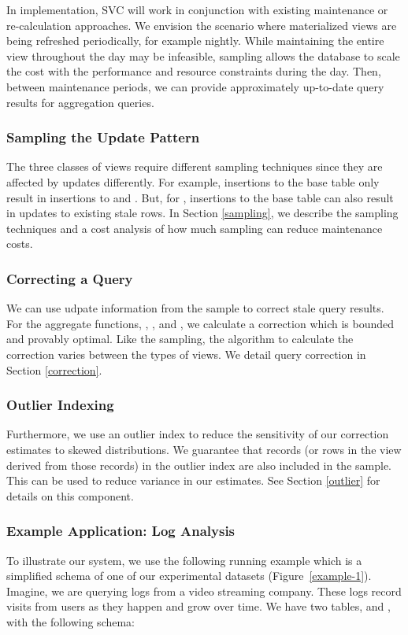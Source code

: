 In implementation, SVC will work in conjunction with existing maintenance or re-calculation approaches.
We envision the scenario where materialized views are being refreshed periodically, for example nightly.
While maintaining the entire view throughout the day may be infeasible, sampling allows the database to scale the cost with the performance and resource constraints during the day.
Then, between maintenance periods, we can provide approximately up-to-date query results for aggregation queries.

\subsubsection{Sampling the Update Pattern}
The three classes of views require different sampling techniques since they are affected by updates differently.
For example, insertions to the base table only result in insertions to \spview and \fjview.
But, for \aggview, insertions to the base table can also result in updates to existing stale rows.
In Section \ref{sampling}, we describe the sampling techniques and a cost analysis of how much sampling can reduce maintenance costs.

\subsubsection{Correcting a Query}
We can use udpate information from the sample to correct stale query results.
For the aggregate functions, \sumfunc, \countfunc, and \avgfunc, we calculate a correction
which is bounded and provably optimal.
Like the sampling, the algorithm to calculate the correction varies between the types of views.
We detail query correction in Section \ref{correction}.

\subsubsection{Outlier Indexing}
Furthermore, we use an outlier index to reduce the sensitivity of our correction estimates to skewed distributions. 
We guarantee that records (or rows in the view derived from those records) 
in the outlier index are also included in the sample.
This can be used to reduce variance in our estimates.
See Section \ref{outlier} for details on this component.

\subsubsection{Example Application: Log Analysis}
To illustrate our system, we use the following running example which is a 
simplified schema of one of our experimental datasets (Figure~\ref{example-1}).
Imagine, we are querying logs from a video streaming company. 
These logs record visits from users as they happen and grow over time.
We have two tables,  and , with the following schema:

